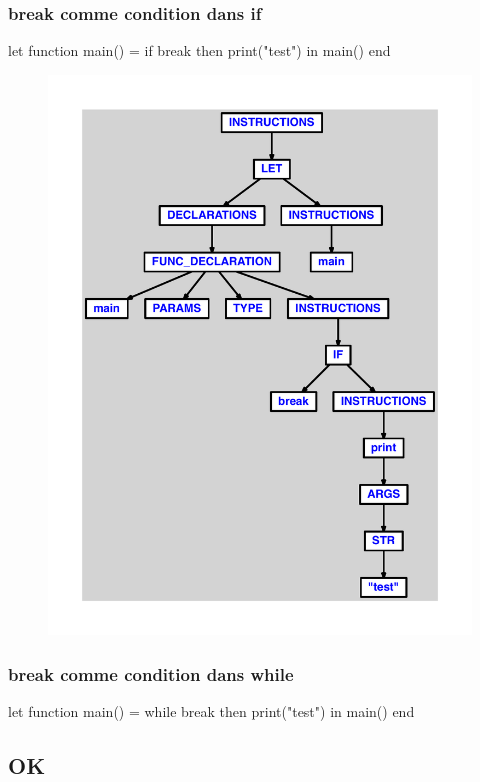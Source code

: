 \documentclass{article}
\begin{document}
\subsubsection{break comme condition dans if}
\begin{verbatimtab}
let
	function main() =
		if break then
			print("test")
in main() end
\end{verbatimtab}
\begin{figure}[H]\centering\includegraphics[max width=\textwidth]{ast/ast_7.pdf}\end{figure}\subsubsection{break comme condition dans while}
\begin{verbatimtab}
let
	function main() =
		while break then
			print("test")
in main() end
\end{verbatimtab}
\subsection{OK}
\end{document}
